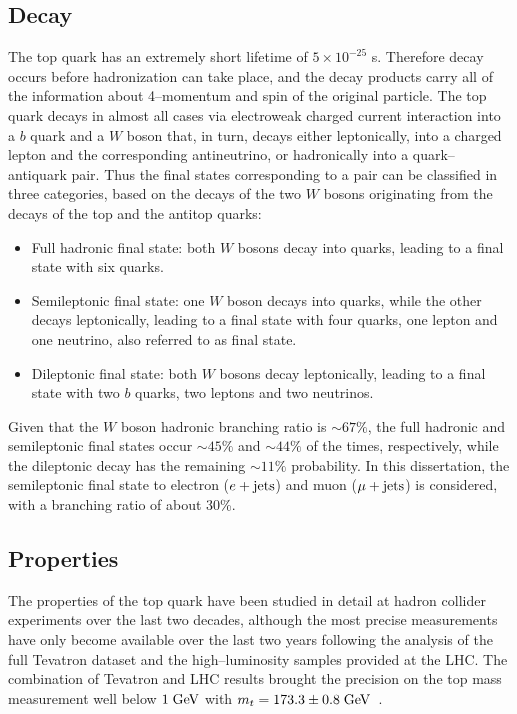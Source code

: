 \subsection{Decay}
\label{sec:topdecay}

The top quark has an extremely short lifetime of $5\times{}10^{-25}$
s. Therefore decay occurs before hadronization can take place, and the
decay products carry all of the information about \mbox{4--momentum} and spin
of the original particle.
The top quark decays in almost all cases via electroweak
charged current interaction into a $b$ quark and a $W$ boson that,
in turn, decays either leptonically, into a charged lepton and the corresponding
antineutrino, or hadronically into a quark--antiquark pair. Thus the
final states corresponding to a \ttbar{} pair can be classified in
three categories, based on the decays of the two $W$ bosons
originating from the decays of the top and the antitop quarks:
\begin{itemize}
\item Full hadronic final state: both $W$ bosons decay into quarks,
  leading to a \ttbar{} final state with six quarks.
\item Semileptonic final state: one $W$ boson decays into quarks,
  while the other decays leptonically, leading to a final state with
  four quarks, one lepton and one neutrino, also referred to as
  \ljets{} final state.
\item Dileptonic final state: both $W$ bosons decay leptonically,
  leading to a final state with two $b$ quarks, two leptons and two
  neutrinos. 
\end{itemize}
Given that the $W$ boson hadronic branching ratio is
$\sim67\%$, the full hadronic and semileptonic final states occur
$\sim45\%$ and $\sim44\%$ of the times, respectively, while the
dileptonic decay has the remaining $\sim11\%$ probability. In this
dissertation, the semileptonic final state to electron ($e+{\rm jets}{}$)
and muon ($\mu+{\rm jets}$) is considered, with a branching ratio of about
30\%.

\subsection{Properties}
\label{sec:topprop}

The properties of the top quark have been studied in detail at hadron
collider experiments over the last two decades, although the most
precise measurements have only become available over the last two
years following the analysis of the full Tevatron dataset and the
high--luminosity samples provided at the LHC. 
The combination of Tevatron and LHC results
brought the precision on the top mass measurement well below $1 \; \mathrm{GeV}{}$
with $m_t=173.3\pm{}0.8 \; \mathrm{GeV}{}$~\cite{topmass}.

